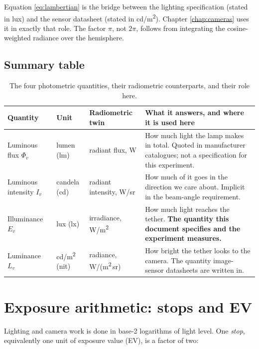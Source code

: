 Equation \ref{eq:lambertian} is the bridge between the lighting specification (stated in lux) and the sensor datasheet (stated in cd/m\textsuperscript{2}). Chapter \ref{chap:cameras} uses it in exactly that role. The factor $\pi$, not $2\pi$, follows from integrating the cosine-weighted radiance over the hemisphere.

\subsection{Summary table}

\begin{table}[!ht]
\centering
\small
\caption[Photometric quantities used in this document]{The four photometric quantities, their radiometric counterparts, and their role here.}
\label{tab:quantities}
\begin{tabularx}{\textwidth}{p{} p{} p{} X}
\toprule
\textbf{Quantity} & \textbf{Unit} & \textbf{Radiometric twin} & \textbf{What it answers, and where it is used here} \\
\midrule
Luminous flux $\Phi_v$ & lumen (lm) & radiant flux, W & How much light the lamp makes in total. Quoted in manufacturer catalogues; not a specification for this experiment. \\
Luminous intensity $I_v$ & candela (cd) & radiant intensity, W/sr & How much of it goes in the direction we care about. Implicit in the beam-angle requirement. \\
Illuminance $E_v$ & lux (lx) & irradiance, W/m\textsuperscript{2} & How much light reaches the tether. \textbf{The quantity this document specifies and the experiment measures.} \\
Luminance $L_v$ & cd/m\textsuperscript{2} (nit) & radiance, W/(m\textsuperscript{2}\,sr) & How bright the tether looks to the camera. The quantity image-sensor datasheets are written in. \\
\bottomrule
\end{tabularx}
\end{table}

\section{Exposure arithmetic: stops and EV}
\label{sec:stops}

Lighting and camera work is done in base-2 logarithms of light level. One \emph{stop}, equivalently one unit of exposure value (EV), is a factor of two:

